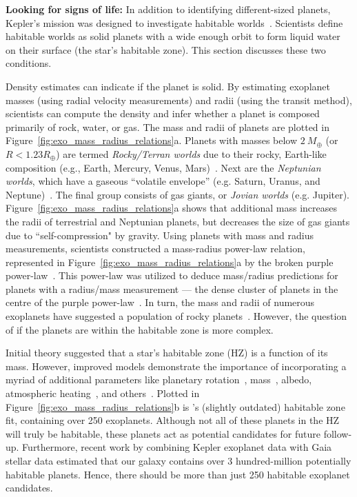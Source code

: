 \textbf{Looking for signs of life:}
In addition to identifying different-sized planets, Kepler's mission was designed to investigate habitable worlds~\cite{kepler_mission}.
Scientists define habitable worlds as solid planets with a wide enough orbit to form liquid water on their surface (the star's habitable zone).
This section discusses these two conditions.

Density estimates can indicate if the planet is solid.
By estimating exoplanet masses (using radial velocity measurements) and radii (using the transit method), scientists can compute the density and infer whether a planet is composed primarily of rock, water, or gas.
The mass and radii of planets are plotted in Figure~\ref{fig:exo_mass_radius_relations}a. 
Planets with masses below $2\ M_{\oplus}$ (or $R < 1.23 R_{\oplus}$) are termed \textit{Rocky/Terran worlds} due to their rocky, Earth-like composition (e.g., Earth, Mercury, Venus, Mars)~\cite{Oppenheimer:2016:Sci}.
Next are the \textit{Neptunian worlds}, which have a gaseous ``volatile envelope'' (e.g. Saturn, Uranus, and Neptune)~\cite{Chen:2017:ApJ}.
The final group consists of gas giants, or \textit{Jovian worlds} (e.g. Jupiter).
Figure~\ref{fig:exo_mass_radius_relations}a shows that additional mass increases the radii of terrestrial and Neptunian planets, but decreases the size of gas giants due to ``self-compression" by gravity.
Using planets with mass and radius measurements, scientists constructed a mass-radius power-law relation, represented in Figure~\ref{fig:exo_mass_radius_relations}a by the broken purple power-law~\cite{Chen:2017:ApJ}.
This power-law was utilized to deduce mass/radius predictions for planets with a radius/mass measurement — the dense cluster of planets in the centre of the purple power-law~\cite{Chen:2017:ApJ}.
In turn, the mass and radii of numerous exoplanets have suggested a population of rocky planets~\cite{kepler_mission}.
However, the question of if the planets are within the habitable zone is more complex.


Initial theory suggested that a star's habitable zone (HZ) is a function of its mass. 
However, improved models demonstrate the importance of incorporating a myriad of additional parameters like planetary rotation~\cite{Yang:2014:ApJL},  mass~\cite{Kopparapu:2014:ApJL}, albedo, atmospheric heating~\cite{Kasting:2011:AsBio}, and others~\cite{Yang:2014:ApJL, Kopparapu:2013:ApJ, Kopparapu:2014:ApJL, Shields:2014:ApJL}. 
Plotted in Figure~\ref{fig:exo_mass_radius_relations}b is \citet{Kopparapu:2014:ApJL}'s (slightly outdated) habitable zone fit, containing over 250 exoplanets.
Although not all of these planets in the HZ will truly be habitable, these planets act as potential candidates for future follow-up. 
Furthermore, recent work by 
\citet{Bryson:2021:AJ} combining Kepler exoplanet data with Gaia stellar data estimated that our galaxy contains over 3 hundred-million potentially habitable planets.
Hence, there should be more than just 250 habitable exoplanet candidates.


